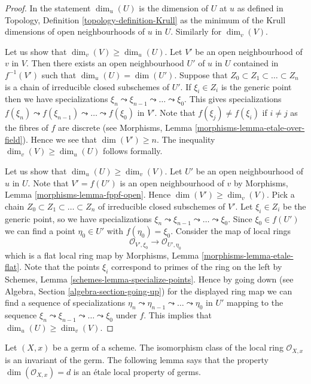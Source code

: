\begin{proof}
In the statement $\dim_u(U)$ is the dimension of $U$ at $u$ as defined in
Topology, Definition \ref{topology-definition-Krull}
as the minimum of the Krull dimensions of open neighbourhoods of $u$ in $U$.
Similarly for $\dim_v(V)$.

\medskip\noindent
Let us show that $\dim_v(V) \geq \dim_u(U)$.
Let $V'$ be an open neighbourhood of $v$ in $V$.
Then there exists an open neighbourhood $U'$ of $u$ in $U$
contained in $f^{-1}(V')$ such that $\dim_u(U) = \dim(U')$. Suppose that
$Z_0 \subset Z_1 \subset \ldots \subset Z_n$ is a chain of irreducible
closed subschemes of $U'$. If $\xi_i \in Z_i$ is the generic point
then we have specializations
$\xi_n \leadsto \xi_{n - 1} \leadsto \ldots \leadsto \xi_0$.
This gives specializations
$f(\xi_n) \leadsto f(\xi_{n - 1}) \leadsto \ldots \leadsto f(\xi_0)$
in $V'$. Note that $f(\xi_j) \not = f(\xi_i)$ if $i \not = j$ as
the fibres of $f$ are discrete (see
Morphisms, Lemma \ref{morphisms-lemma-etale-over-field}).
Hence we see that $\dim(V') \geq n$. The inequality
$\dim_v(V) \geq \dim_u(U)$ follows formally.

\medskip\noindent
Let us show that $\dim_u(U) \geq \dim_v(V)$.
Let $U'$ be an open neighbourhood of $u$ in $U$.
Note that $V' = f(U')$ is an open neighbourhood of $v$ by
Morphisms, Lemma \ref{morphisms-lemma-fppf-open}.
Hence $\dim(V') \geq \dim_v(V)$. Pick a chain
$Z_0 \subset Z_1 \subset \ldots \subset Z_n$ of irreducible
closed subschemes of $V'$. Let $\xi_i \in Z_i$ be the generic point,
so we have specializations
$\xi_n \leadsto \xi_{n - 1} \leadsto \ldots \leadsto \xi_0$.
Since $\xi_0 \in f(U')$ we can find a point $\eta_0 \in U'$
with $f(\eta_0) = \xi_0$. Consider the map of local rings
$$
\mathcal{O}_{V', \xi_0} \longrightarrow \mathcal{O}_{U', \eta_0}
$$
which is a flat local ring map by
Morphisms, Lemma \ref{morphisms-lemma-etale-flat}.
Note that the points $\xi_i$ correspond to primes of the ring on the left by
Schemes, Lemma \ref{schemes-lemma-specialize-points}.
Hence by going down (see
Algebra, Section \ref{algebra-section-going-up})
for the displayed ring map we can find a sequence of specializations
$\eta_n \leadsto \eta_{n - 1} \leadsto \ldots \leadsto \eta_0$
in $U'$ mapping to the sequence
$\xi_n \leadsto \xi_{n - 1} \leadsto \ldots \leadsto \xi_0$
under $f$. This implies that $\dim_u(U) \geq \dim_v(V)$.
\end{proof}

\noindent
Let $(X, x)$ be a germ of a scheme.
The isomorphism class of the local ring $\mathcal{O}_{X, x}$
is an invariant of the germ. The following lemma says that the
property $\dim(\mathcal{O}_{X, x}) = d$ is an \'etale local property
of germs.

